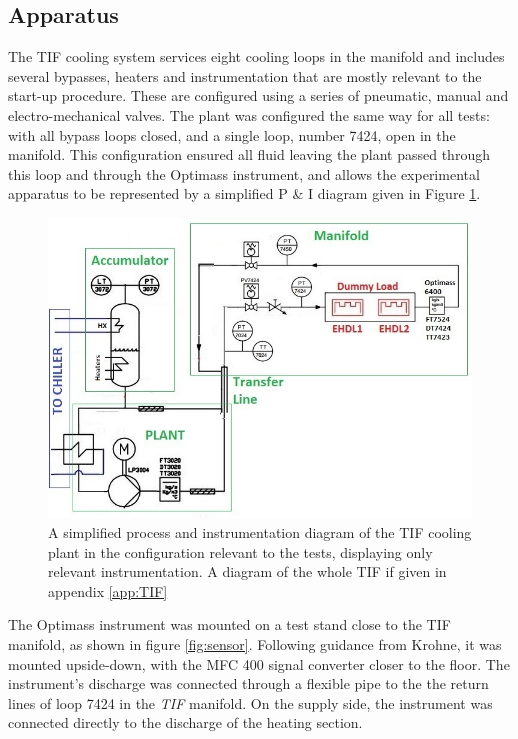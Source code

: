 \documentclass{report}
\begin{document}
\subsection{Apparatus}
The TIF cooling system services eight cooling loops in the manifold and includes several bypasses, heaters and instrumentation that are mostly relevant to the  start-up procedure. These are configured using a series of pneumatic, manual and electro-mechanical valves. 
The plant was configured the same way for all tests: with all bypass loops closed, and a single loop, number 7424, open in the manifold. This configuration ensured all fluid leaving the plant passed through this loop and through the Optimass instrument, and allows the experimental apparatus to be represented by a simplified P \& I diagram given in Figure \ref{fig:TIfsimplified}.\\
\FloatBarrier
\begin{figure}[h]
\includegraphics[width=\textwidth]{TIFsimplified.jpg}
\caption{A simplified process and instrumentation diagram of the TIF cooling plant in the configuration relevant to the tests, displaying only relevant instrumentation. A diagram of the whole TIF if given in appendix \ref{app:TIF}}
\label{fig:TIfsimplified}
\end{figure}
\FloatBarrier
The Optimass instrument was mounted on a test stand close to the TIF manifold, as shown in figure \ref{fig:sensor}. Following guidance from Krohne, it was mounted upside-down, with the MFC 400 signal converter closer to the floor. The instrument's discharge was connected through a flexible pipe to the the return lines of loop 7424 in the \textit{TIF} manifold. On the supply side, the instrument was connected directly to the discharge of the heating section. \\
\end{document}
